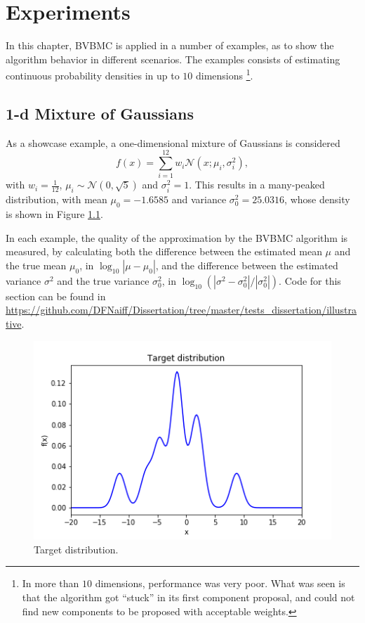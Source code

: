 \chapter{Experiments}
In this chapter, BVBMC is applied in a number of examples, as to show the algorithm behavior in different scenarios. The examples consists of estimating continuous probability densities in up to $10$ dimensions \footnote{In more than $10$ dimensions, performance was very poor. What was seen is that the algorithm got \enquote{stuck} in its first component proposal, and could not find new components to be proposed with acceptable weights.}.

\section{1-d Mixture of Gaussians}

As a showcase example, a one-dimensional mixture of Gaussians is considered
\begin{displaymath}
 f(x) = \sum_{i=1}^{12} w_i \mathcal{N}(x;\mu_i,\sigma^2_i),
\end{displaymath}
with $w_i = \frac{1}{12}$, $\mu_i \sim \mathcal{N}(0,\sqrt{5})$ and $\sigma^2_i = 1$. This results in a many-peaked distribution, with mean $\mu_0=-1.6585$ and variance $\sigma^2_0 = 25.0316$, whose density is shown in Figure \ref{target1dmixture}. 

In each example, the quality of the approximation by the BVBMC algorithm is measured, by calculating both the difference between the estimated mean $\mu$ and the true mean $\mu_0$, in $\log_{10}|\mu - \mu_0|$, and the difference between the estimated variance $\sigma^2$ and the true variance $\sigma^2_0$, in $\log_{10}(|\sigma^2-\sigma^2_0|/|\sigma^2_0|)$. Code for this section can be found in \url{https://github.com/DFNaiff/Dissertation/tree/master/tests_dissertation/illustrative}. 

\begin{figure}
	\centering
	\includegraphics[width=0.7\linewidth]{figs/targetexil1a.png}
	\caption{\label{target1dmixture} Target distribution.}
\end{figure}

